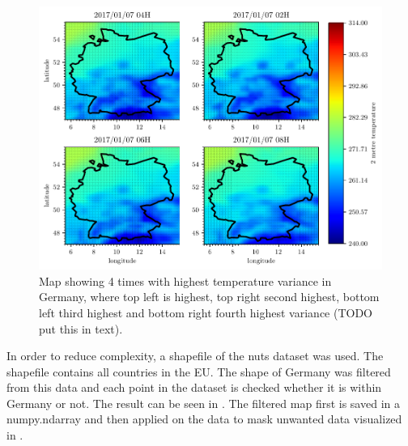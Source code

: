 \begin{figure}[h!]%
\centering
\includegraphics[width=\textwidth]{plots/t2m/bundles/maxvar4_maps}%
\caption{Map showing 4 times with highest temperature variance in Germany, where top left is highest, top right second highest, bottom left third highest and bottom right fourth highest variance (TODO put this in text).}%
\label{fig:maxvar4_maps}%
\end{figure}

In order to reduce complexity, a shapefile of the \acrshort{nuts} dataset was used. The shapefile contains all countries in the EU. The shape of Germany was filtered from this data and each point in the dataset is checked whether it is within Germany or not. The result can be seen in . The filtered map first is saved in a numpy.ndarray and then applied on the data to mask unwanted data visualized in .\\

